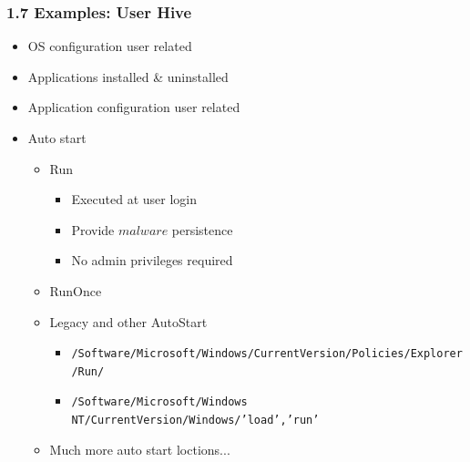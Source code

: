 \begin{frame}[fragile]
  \frametitle{1.7 Examples: User Hive}
   \begin{itemize}
      \item OS configuration user related
      \item Applications installed \& uninstalled
      \item Application configuration user related
      \item Auto start
      \begin{itemize}
          \item Run
              \begin{itemize}
                  \item Executed at user login
                  \item Provide \(malware\) persistence
                  \item No admin privileges required
              \end{itemize}
          \item RunOnce
          \item Legacy and other AutoStart
              \begin{itemize}
		      \item \texttt{\scriptsize{/Software/Microsoft/Windows/CurrentVersion/Policies/Explorer/Run/}}
		      \item \texttt{\scriptsize{/Software/Microsoft/Windows NT/CurrentVersion/Windows/'load','run'}}
              \end{itemize}
          \item Much more auto start loctions... 
      \end{itemize}
   \end{itemize}
\end{frame}


